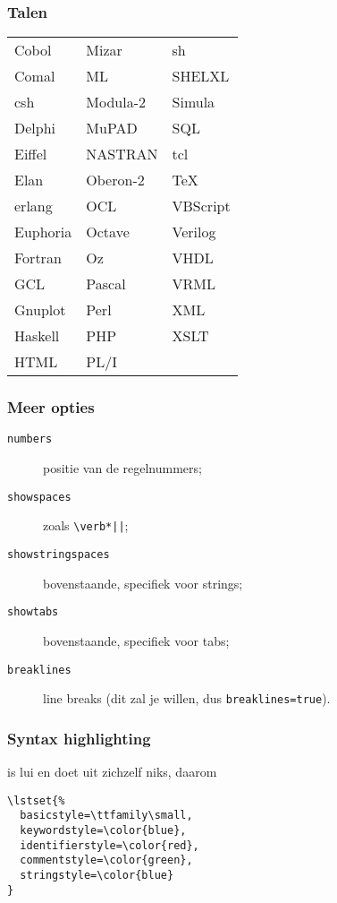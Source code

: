 \begin{frame}
  \frametitle{Talen}

  \small
  \begin{tabular}{lll}
    Cobol & Mizar & sh          \\
    Comal & ML & SHELXL         \\
    csh & Modula-2 & Simula     \\
    Delphi & MuPAD & SQL        \\
    Eiffel & NASTRAN & tcl      \\
    Elan & Oberon-2 & TeX       \\
    erlang & OCL & VBScript     \\
    Euphoria & Octave & Verilog \\
    Fortran & Oz & VHDL         \\
    GCL & Pascal & VRML         \\
    Gnuplot & Perl & XML        \\
    Haskell & PHP & XSLT        \\
    HTML & PL/I
  \end{tabular}
\end{frame}

\begin{frame}[fragile]
  \frametitle{Meer opties}

  \begin{description}
    \item[\texttt{numbers}] positie van de regelnummers;
    \item[\texttt{showspaces}] zoals \verb!\verb*||!;
    \item[\texttt{showstringspaces}] bovenstaande, specifiek voor strings;
    \item[\texttt{showtabs}] bovenstaande, specifiek voor tabs;
    \item[\texttt{breaklines}] line breaks (dit zal je willen, dus \verb|breaklines=true|).
  \end{description}
\end{frame}

\begin{frame}[fragile]
  \frametitle{Syntax highlighting}

   is lui en doet uit zichzelf niks, daarom
  \begin{verbatim}
\lstset{%
  basicstyle=\ttfamily\small,
  keywordstyle=\color{blue},
  identifierstyle=\color{red},
  commentstyle=\color{green},
  stringstyle=\color{blue}
}
\end{verbatim}
\end{frame}

